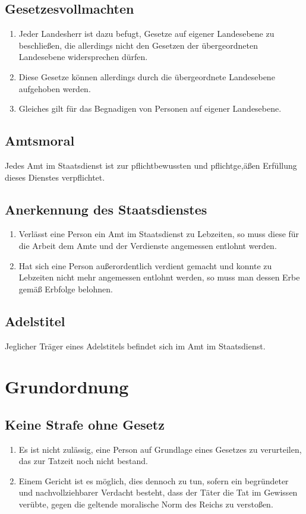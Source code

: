\documentclass{article}
\begin{document}
\subsection{Gesetzesvollmachten}
\begin{enumerate}
    \item Jeder Landesherr ist dazu befugt, Gesetze auf eigener Landesebene zu beschließen, 
          die allerdings nicht den Gesetzen der übergeordneten Landesebene widersprechen dürfen.
    \item Diese Gesetze können allerdings durch die übergeordnete Landesebene aufgehoben werden.
    \item Gleiches gilt für das Begnadigen von Personen auf eigener Landesebene.
\end{enumerate}

\subsection{Amtsmoral}
Jedes Amt im Staatsdienst ist zur pflichtbewussten und pflichtge,äßen Erfüllung dieses Dienstes verpflichtet.

\subsection{Anerkennung des Staatsdienstes}
\begin{enumerate}
    \item Verlässt eine Person ein Amt im Staatsdienst zu Lebzeiten, so muss diese für die Arbeit dem Amte und der Verdienste angemessen
    entlohnt werden.
    \item Hat sich eine Person außerordentlich verdient gemacht und konnte zu Lebzeiten nicht mehr angemessen entlohnt werden, so muss man dessen
    Erbe gemäß Erbfolge belohnen.
\end{enumerate}

\subsection{Adelstitel}
Jeglicher Träger eines Adelstitels befindet sich im Amt im Staatsdienst.

\newpage
\section{Grundordnung}
\subsection{Keine Strafe ohne Gesetz}\label{npwl}
\begin{enumerate}
    \item Es ist nicht zulässig, eine Person auf Grundlage eines Gesetzes zu
    verurteilen, das zur Tatzeit noch nicht bestand.
    \item Einem Gericht ist es möglich, dies dennoch zu tun, sofern ein begründeter
    und nachvollziehbarer Verdacht besteht, dass der Täter die Tat im Gewissen verübte, gegen
    die geltende moralische Norm des Reichs zu verstoßen.
\end{enumerate}
\end{document}
